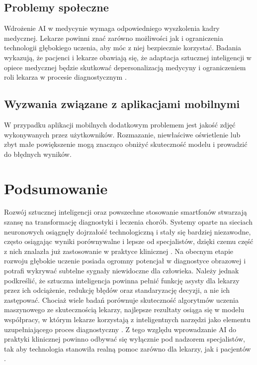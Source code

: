 \subsection{Problemy społeczne}
Wdrożenie AI w medycynie wymaga odpowiedniego wyszkolenia kadry medycznej.
Lekarze powinni znać zarówno możliwości jak i ograniczenia technologii głębokiego uczenia, aby móc z niej bezpiecznie korzystać.
Badania wykazują, że pacjenci i lekarze obawiają się, że adaptacja sztucznej inteligencji w opiece medycznej będzie skutkować depersonalizacją medycyny i ograniczeniem roli lekarza w procesie diagnostycznym \cite{Tang_Li_Fantus_2023}.

\subsection{Wyzwania związane z aplikacjami mobilnymi}
W przypadku aplikacji mobilnych dodatkowym problemem jest jakość zdjęć wykonywanych przez użytkowników.
Rozmazanie, niewłaściwe oświetlenie lub zbyt małe powiększenie mogą znacząco obniżyć skuteczność modelu i prowadzić do błędnych wyników.

\section{Podsumowanie}
Rozwój sztucznej inteligencji oraz powszechne stosowanie smartfonów stwarzają szansę na transformację diagnostyki i leczenia chorób.
Systemy oparte na sieciach neuronowych osiągnęły dojrzałość technologiczną i stały się bardziej niezawodne, często osiągając wyniki porównywalne i lepsze od specjalistów, dzięki czemu część z nich znalazła już zastosowanie w praktyce klinicznej \cite{Li_Koban_Schenck_Giunta_Li_Sun_2022}.
Na obecnym etapie rozwoju głębokie uczenie posiada ogromny potencjał w diagnostyce obrazowej i potrafi wykrywać subtelne sygnały niewidoczne dla człowieka.
Należy jednak podkreślić, że sztuczna inteligencja powinna pełnić funkcję asysty dla lekarzy przez ich odciążenie, redukcję błędów oraz standaryzację decyzji, a nie ich zastępować.
Chociaż wiele badań porównuje skuteczność algorytmów uczenia maszynowego ze skutecznością lekarzy, najlepsze rezultaty osiąga się w modelu współpracy, w którym lekarze korzystają z inteligentnych narzędzi jako elementu uzupełniającego proces diagnostyczny \cite{Kelly_Karthikesalingam_Suleyman_Corrado_King_2019}.
Z tego względu wprowadzanie AI do praktyki klinicznej powinno odbywać się wyłącznie pod nadzorem specjalistów, tak aby technologia stanowiła realną pomoc zarówno dla lekarzy, jak i pacjentów \cite{9113301, Kelly_Karthikesalingam_Suleyman_Corrado_King_2019}.

